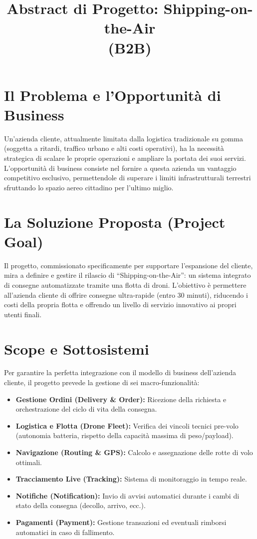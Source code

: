 \documentclass[12pt, a4paper]{article}
\title{\textbf{Abstract di Progetto: Shipping-on-the-Air}\\ \large (B2B)}
\author{}
\date{}
\begin{document}
\maketitle

\section*{Il Problema e l'Opportunità di Business }
Un'azienda cliente, attualmente limitata dalla logistica tradizionale su gomma (soggetta a ritardi, traffico urbano e alti costi operativi), ha la necessità strategica di scalare le proprie operazioni e ampliare la portata dei suoi servizi. L'opportunità di business consiste nel fornire a questa azienda un vantaggio competitivo esclusivo, permettendole di superare i limiti infrastrutturali terrestri sfruttando lo spazio aereo cittadino per l'ultimo miglio.

\section*{La Soluzione Proposta (Project Goal)}
Il progetto, commissionato specificamente per supportare l'espansione del cliente, mira a definire e gestire il rilascio di ``Shipping-on-the-Air'': un sistema integrato di consegne automatizzate tramite una flotta di droni. L'obiettivo è permettere all'azienda cliente di offrire consegne ultra-rapide (entro 30 minuti), riducendo i costi della propria flotta e offrendo un livello di servizio innovativo ai propri utenti finali.

\section*{Scope e Sottosistemi}
Per garantire la perfetta integrazione con il modello di business dell'azienda cliente, il progetto prevede la gestione di sei macro-funzionalità:
\begin{itemize}[label=\textbullet]
    \item \textbf{Gestione Ordini (Delivery \& Order):} Ricezione della richiesta e orchestrazione del ciclo di vita della consegna.
    \item \textbf{Logistica e Flotta (Drone Fleet):} Verifica dei vincoli tecnici pre-volo (autonomia batteria, rispetto della capacità massima di peso/payload).
    \item \textbf{Navigazione (Routing \& GPS):} Calcolo e assegnazione delle rotte di volo ottimali.
    \item \textbf{Tracciamento Live (Tracking):} Sistema di monitoraggio in tempo reale.
    \item \textbf{Notifiche (Notification):} Invio di avvisi automatici durante i cambi di stato della consegna (decollo, arrivo, ecc.).
    \item \textbf{Pagamenti (Payment):} Gestione transazioni ed eventuali rimborsi automatici in caso di fallimento.
\end{itemize}
\end{document}
